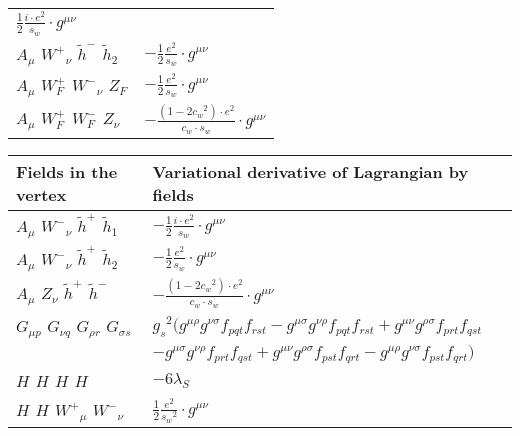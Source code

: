\begin{center}
\begin{tabular}{|l|l|}
	$\frac{1}{2}\frac{ i \cdot e{}^2 }{ s_w}\cdot g^{\mu \nu} $\\[2mm]
${A}_{\mu }$ \phantom{-} $W^+{}_{\nu }$ \phantom{-} $\widetilde{h}^-{}_{}$ \phantom{-} $\widetilde{h}_2{}_{}$ \phantom{-}  &
	$-\frac{1}{2}\frac{ e{}^2 }{ s_w}\cdot g^{\mu \nu} $\\[2mm]
${A}_{\mu }$ \phantom{-} $W^+_F{}_{}$ \phantom{-} $W^-{}_{\nu }$ \phantom{-} $Z_F{}_{}$ \phantom{-}  &
	$-\frac{1}{2}\frac{ e{}^2 }{ s_w}\cdot g^{\mu \nu} $\\[2mm]
${A}_{\mu }$ \phantom{-} $W^+_F{}_{}$ \phantom{-} $W^-_F{}_{}$ \phantom{-} ${Z}_{\nu }$ \phantom{-}  &
	$-\frac{ (1-2 c_w {}^2) \cdot e{}^2 }{ c_w \cdot s_w}\cdot g^{\mu \nu} $\\ \hline
\end{tabular}

\begin{tabular}{|l|l|} \hline
Fields in the vertex & Variational derivative of Lagrangian by fields \\ \hline
${A}_{\mu }$ \phantom{-} $W^-{}_{\nu }$ \phantom{-} $\widetilde{h}^+{}_{}$ \phantom{-} $\widetilde{h}_1{}_{}$ \phantom{-}  &
	$-\frac{1}{2}\frac{ i \cdot e{}^2 }{ s_w}\cdot g^{\mu \nu} $\\[2mm]
${A}_{\mu }$ \phantom{-} $W^-{}_{\nu }$ \phantom{-} $\widetilde{h}^+{}_{}$ \phantom{-} $\widetilde{h}_2{}_{}$ \phantom{-}  &
	$-\frac{1}{2}\frac{ e{}^2 }{ s_w}\cdot g^{\mu \nu} $\\[2mm]
${A}_{\mu }$ \phantom{-} ${Z}_{\nu }$ \phantom{-} $\widetilde{h}^+{}_{}$ \phantom{-} $\widetilde{h}^-{}_{}$ \phantom{-}  &
	$-\frac{ (1-2 c_w {}^2) \cdot e{}^2 }{ c_w \cdot s_w}\cdot g^{\mu \nu} $\\[2mm]
${G}_{\mu p }$ \phantom{-} ${G}_{\nu q }$ \phantom{-} ${G}_{\rho r }$ \phantom{-} ${G}_{\sigma s }$ \phantom{-}  &
	$ g_s{}^2 \big(g^{\mu \rho} g^{\nu \sigma} f_{p q t} f_{r s t} -g^{\mu \sigma} g^{\nu \rho} f_{p q t} f_{r s t} +g^{\mu \nu} g^{\rho \sigma} f_{p r t} f_{q s t} $ \\[2mm]
  & $-g^{\mu \sigma} g^{\nu \rho} f_{p r t} f_{q s t} +g^{\mu \nu} g^{\rho \sigma} f_{p s t} f_{q r t} -g^{\mu \rho} g^{\nu \sigma} f_{p s t} f_{q r t} \big)$\\[2mm]
${H}_{}$ \phantom{-} ${H}_{}$ \phantom{-} ${H}_{}$ \phantom{-} ${H}_{}$ \phantom{-}  &
	$-6 \lambda_S$\\[2mm]
${H}_{}$ \phantom{-} ${H}_{}$ \phantom{-} $W^+{}_{\mu }$ \phantom{-} $W^-{}_{\nu }$ \phantom{-}  &
	$\frac{1}{2}\frac{ e{}^2 }{ s_w{}^2 }\cdot g^{\mu \nu} $\\[2mm]

\end{tabular}
\end{center}
